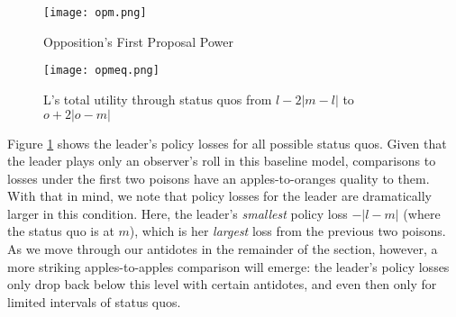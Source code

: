 \documentclass[12pt]{article}
\theoremstyle{plain}		      \newtheorem{assn}{Assumption}
\theoremstyle{plain}		      \newtheorem{prop}{Proposition}
\theoremstyle{plain}		      \newtheorem{lemma}{Lemma}
\theoremstyle{plain}	          \newtheorem{imp}{Implication}
\theoremstyle{plain}	          \newtheorem{hyp}{Hypothesis}
\theoremstyle{definition}		  \newtheorem{defn}{Definition}
\theoremstyle{remark}	          \newtheorem{rem}{Remark}
\theoremstyle{definition}         \newtheorem{case}{Case}
\begin{document}
\begin{figure}[h]
  \centering
  \begin{minipage}[b]{0.3\textwidth}
    \texttt{[image: opm.png]}
    \caption{Opposition's First Proposal Power}
    \label{opm}
  \end{minipage}
  \hfill
  \begin{minipage}[b]{0.6\textwidth}
    \texttt{[image: opmeq.png]}
    \caption{L's total utility through status quos from \newline $l-2|m-l|$ to $o+2|o-m|$}
    \label{opmeq}
  \end{minipage}
\end{figure}
\FloatBarrier

 \indent Figure \ref{opmeq} shows the leader's policy losses for all possible status quos. Given that the leader plays only an observer's roll in this baseline model, comparisons to losses under the first two poisons have an apples-to-oranges quality to them. With that in mind, we note that policy losses for the leader are dramatically larger in this condition. Here, the leader's \textit{smallest} policy loss $-|l-m|$ (where the status quo is at $m$), which is her \textit{largest} loss from the previous two poisons. As we move through our antidotes in the remainder of the section, however, a more striking apples-to-apples comparison will emerge: the leader's policy losses only drop back below this level with certain antidotes, and even then only for limited intervals of status quos.
\end{document}
